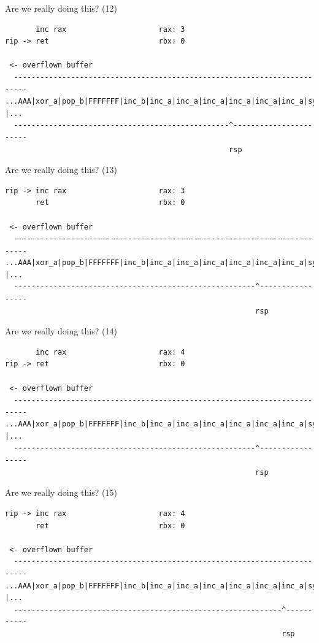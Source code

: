 \documentclass[9pt,aspectratio=169]{beamer}
\begin{document}
\begin{frame}[label={sec:orgf6ec11d},fragile]{Are we really doing this? (12)}
 \begin{verbatim}
       inc rax                     rax: 3
rip -> ret                         rbx: 0

 <- overflown buffer 
  -------------------------------------------------------------------------
...AAA|xor_a|pop_b|FFFFFFF|inc_b|inc_a|inc_a|inc_a|inc_a|inc_a|inc_a|sys |...
  -------------------------------------------------^-----------------------
                                                   rsp
\end{verbatim}
\end{frame}
\begin{frame}[label={sec:org28d2cd0},fragile]{Are we really doing this? (13)}
 \begin{verbatim}
rip -> inc rax                     rax: 3
       ret                         rbx: 0

 <- overflown buffer 
  -------------------------------------------------------------------------
...AAA|xor_a|pop_b|FFFFFFF|inc_b|inc_a|inc_a|inc_a|inc_a|inc_a|inc_a|sys |...
  -------------------------------------------------------^-----------------
                                                         rsp
\end{verbatim}
\end{frame}
\begin{frame}[label={sec:org9850fcc},fragile]{Are we really doing this? (14)}
 \begin{verbatim}
       inc rax                     rax: 4
rip -> ret                         rbx: 0

 <- overflown buffer 
  -------------------------------------------------------------------------
...AAA|xor_a|pop_b|FFFFFFF|inc_b|inc_a|inc_a|inc_a|inc_a|inc_a|inc_a|sys |...
  -------------------------------------------------------^-----------------
                                                         rsp
\end{verbatim}
\end{frame}
\begin{frame}[label={sec:org8e35ac5},fragile]{Are we really doing this? (15)}
 \begin{verbatim}
rip -> inc rax                     rax: 4
       ret                         rbx: 0

 <- overflown buffer 
  -------------------------------------------------------------------------
...AAA|xor_a|pop_b|FFFFFFF|inc_b|inc_a|inc_a|inc_a|inc_a|inc_a|inc_a|sys |...
  -------------------------------------------------------------^-----------
                                                               rsp
\end{verbatim}
\end{frame}
\end{document}
